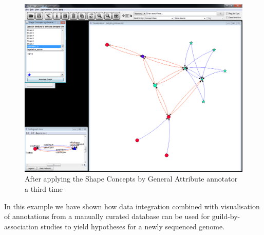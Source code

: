 \begin{figure}[H]
\centering
\includegraphics[scale=0.35]{images/Oct12/app2fig11.png} 
\caption{After applying the Shape Concepts by General Attribute annotator a third time}
\label{fig:bot_shape22}
\end{figure}
In this example we have shown how data integration combined with visualisation of annotations from a manually curated database 
can be used for guild-by-association studies to yield hypotheses for a newly sequenced genome.


\newpage
